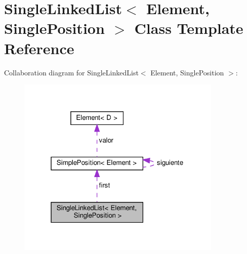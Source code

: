 \hypertarget{class_single_linked_list}{}\section{Single\+Linked\+List$<$ Element, Single\+Position $>$ Class Template Reference}
\label{class_single_linked_list}


Collaboration diagram for Single\+Linked\+List$<$ Element, Single\+Position $>$\+:
\nopagebreak
\begin{figure}[H]
\begin{center}
\leavevmode
\includegraphics[width=277pt]{class_single_linked_list__coll__graph}
\end{center}
\end{figure}
